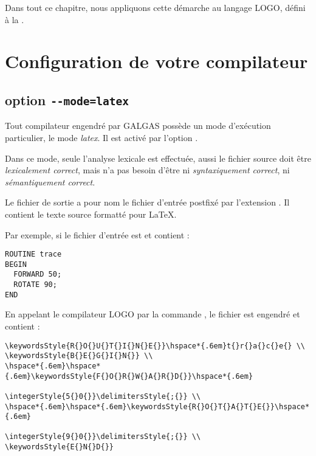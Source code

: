 Dans tout ce chapitre, nous appliquons cette démarche au langage LOGO, défini à la .





\section{Configuration de votre compilateur}

\subsection{option \texttt{-{}-mode=latex}}

Tout compilateur engendré par GALGAS possède un mode d'exécution particulier, le mode \emph{latex}. Il est activé par l'option .

Dans ce mode, seule l'analyse lexicale est effectuée, aussi le fichier source doit être \emph{lexicalement correct}, mais n'a pas besoin d'être ni \emph{syntaxiquement correct}, ni \emph{sémantiquement correct}.

Le fichier de sortie a pour nom le fichier d'entrée postfixé par l'extension . Il contient le texte source formatté pour \LaTeX.

Par exemple, si le fichier d'entrée est  et contient :

\begin{lstlisting}
ROUTINE trace
BEGIN
  FORWARD 50;
  ROTATE 90;
END
\end{lstlisting}

En appelant le compilateur LOGO par la commande , le fichier  est engendré et contient :

{\small
\begin{verbatim}
\keywordsStyle{R{}O{}U{}T{}I{}N{}E{}}\hspace*{.6em}t{}r{}a{}c{}e{} \\
\keywordsStyle{B{}E{}G{}I{}N{}} \\
\hspace*{.6em}\hspace*{.6em}\keywordsStyle{F{}O{}R{}W{}A{}R{}D{}}\hspace*{.6em}
                                       \integerStyle{5{}0{}}\delimitersStyle{;{}} \\
\hspace*{.6em}\hspace*{.6em}\keywordsStyle{R{}O{}T{}A{}T{}E{}}\hspace*{.6em}
                                       \integerStyle{9{}0{}}\delimitersStyle{;{}} \\
\keywordsStyle{E{}N{}D{}}
\end{verbatim}
}

